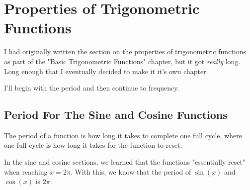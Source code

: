 \chapter{Properties of Trigonometric Functions}
I had originally written the section on the properties of trigonometric functions as part of the "Basic Trigonometric Functions" chapter, but it got \textit{really} long. Long enough that I eventually decided to make it it's own chapter.

I'll begin with the period and then continue to frequency.
\section{Period For The Sine and Cosine Functions}
The period of a function is how long it takes to complete one full cycle, where one full cycle is how long it takes for the function to reset. 

In the sine and cosine sections, we learned that the functions "essentially reset" when reaching $x = 2\pi$. With this, we know that the period of $\sin(x)$ and $\cos(x)$ is $2\pi$.

